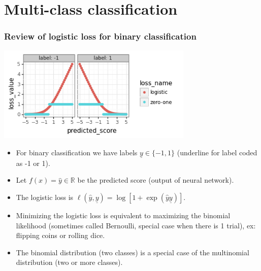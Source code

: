 \documentclass{beamer}
\begin{document}
\section{Multi-class classification}

\begin{frame}
  \frametitle{Review of logistic loss for binary classification}
  \includegraphics[width=0.7\textwidth]{2022-02-15-simplex-binary-loss-scores.png}

  \begin{itemize}
  \item For binary classification we have labels
    $\underline y\in\{-1,1\}$ (underline for label coded as -1 or 1).
  \item Let $f(x)=\hat y\in\mathbb R$ be the predicted score (output
    of neural network).
  \item The logistic loss is $\ell(\hat y, \underline y) = \log[1+\exp(\hat y \underline y)]$.
  \item Minimizing the logistic loss is equivalent to maximizing the
    binomial likelihood (sometimes called Bernoulli, special case when
    there is 1 trial), ex: flipping coins or rolling dice.
  \item The binomial distribution (two classes) is a special case of
    the multinomial distribution (two or more classes).
  \end{itemize}

\end{frame}
\end{document}
